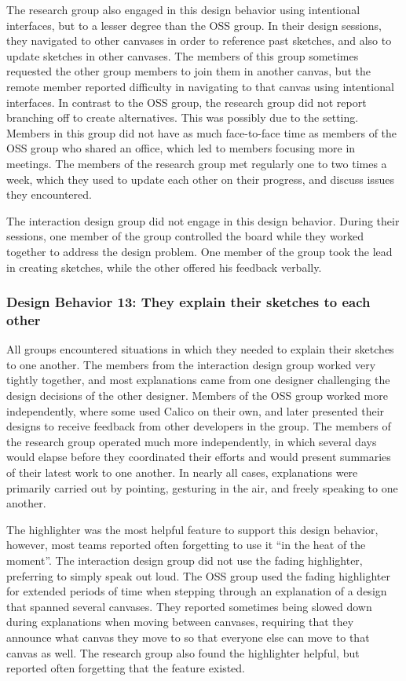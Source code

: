 \documentclass[12pt,fleqn]{ucithesis}
\begin{document}
The research group also engaged in this design behavior using intentional interfaces, but to a lesser degree than the OSS group. In their design sessions, they navigated to other canvases in order to reference past sketches, and also to update sketches in other canvases. The members of this group sometimes requested the other group members to join them in another canvas, but the remote member reported difficulty in navigating to that canvas using intentional interfaces. In contrast to the OSS group, the research group did not report branching off to create alternatives. This was possibly due to the setting. Members in this group did not have as much face-to-face time as members of the OSS group who shared an office, which led to members focusing more in meetings. The members of the research group met regularly one to two times a week, which they used to update each other on their progress, and discuss issues they encountered. 

The interaction design group did not engage in this design behavior. During their sessions, one member of the group controlled the board while they worked together to address the design problem. One member of the group took the lead in creating sketches, while the other offered his feedback verbally.

%

\subsubsection{Design Behavior 13: They explain their sketches to each other}

All groups encountered situations in which they needed to explain their sketches to one another. The members from the interaction design group worked very tightly together, and most explanations came from one designer challenging the design decisions of the other designer. Members of the OSS group worked more independently, where some used Calico on their own, and later presented their designs to receive feedback from other developers in the group. The members of the research group operated much more independently, in which several days would elapse before they coordinated their efforts and would present summaries of their latest work to one another. In nearly all cases, explanations were primarily carried out by pointing, gesturing in the air, and freely speaking to one another.

The highlighter was the most helpful feature to support this design behavior, however, most teams reported often forgetting to use it ``in the heat of the moment''. The interaction design group did not use the fading highlighter, preferring to simply speak out loud. The OSS group used the fading highlighter for extended periods of time when stepping through an explanation of a design that spanned several canvases. They reported sometimes being slowed down during explanations when moving between canvases, requiring that they announce what canvas they move to so that everyone else can move to that canvas as well. The research group also found the highlighter helpful, but reported often forgetting that the feature existed.
\end{document}
